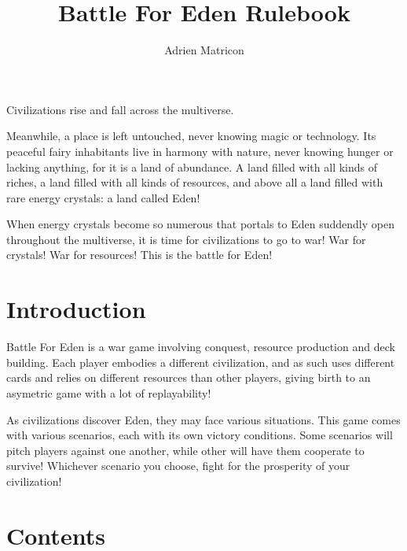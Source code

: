 \documentclass[a4paper]{article}
\author{Adrien Matricon}
\begin{document}
\title{Battle For Eden Rulebook}
\maketitle


    Civilizations rise and fall across the multiverse.

    Meanwhile, a place is left untouched, never knowing magic or technology.
    Its peaceful fairy inhabitants live in harmony with nature,
    never knowing hunger or lacking anything, for it is a land of abundance.
    A land filled with all kinds of riches, a land filled with all kinds of resources,
    and above all a land filled with rare energy crystals: a land called Eden!

    When energy crystals become so numerous that portals to Eden suddendly open
    throughout the multiverse, it is time for civilizations to go to war!
    War for crystals! War for resources! This is the battle for Eden!



\section{Introduction}

    Battle For Eden is a war game involving conquest, resource production and deck
    building.
    Each player embodies a different civilization, and as such uses different cards and
    relies on different resources than other players, giving birth to an asymetric game
    with a lot of replayability!

    As civilizations discover Eden, they may face various situations.
    This game comes with various scenarios, each with its own victory conditions.
    Some scenarios will pitch players against one another, while other will have
    them cooperate to survive!
    Whichever scenario you choose, fight for the prosperity of your civilization!


\newpage
\section{Contents}
\end{document}
